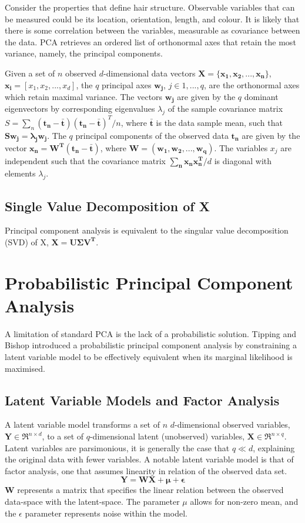 \documentclass[ %
                    author={Dillon Keith Diep [INCOMPLETE DRAFT, NOT FOR SUBMISSION]},
                supervisor={Dr. Carl Henrik Ek},
                    degree={MEng},
                     title={ART-CG:},
                  subtitle={Assisted Real-Time Content Generation of 3D Hair Geometry},
                      type={Research},
                      year={2014} ]{dissertation}
\begin{document}
Consider the properties that define hair structure. Observable variables that can be measured could be its location, orientation, length, and colour. It is likely that there is some correlation between the variables, measurable as covariance between the data. PCA retrieves an ordered list of orthonormal axes that retain the most variance, namely, the principal components.

{ \color{red}
Given a set of $n$ observed $d$-dimensional data vectors $\mathbf{X=\{x_1,x_2,...,x_n\}}$, $\mathbf{x_i} = [x_1,x_2,...,x_d]$, the $q$ principal axes $\mathbf{w_j}$, $j \in {1,...,q}$, are the orthonormal axes which retain maximal variance. The vectors $\mathbf{w_j}$ are given by the $q$ dominant eigenvectors by corresponding eigenvalues $\lambda_j$ of the sample covariance matrix $S=\sum_n\mathbf{(t_n-\bar{t})(t_n-\bar{t})}^T/n$, where $\mathbf{\bar{t}}$ is the data sample mean, such that $\mathbf{Sw_j=\lambda_jw_j}$. The $q$ principal components of the observed data $\mathbf{t_n}$ are given by the vector $\mathbf{x_n=W^T(t_n-\bar{t})}$, where $\mathbf{W=(w_1,w_2,...,w_q)}$. The variables $x_j$ are independent such that the covariance matrix $\mathbf{\sum_nx_nx^T_n}/d$ is diagonal with elements $\lambda_j$.
}

\subsection{Single Value Decomposition of X}
{ \color{red}
Principal component analysis is equivalent to the singular value decomposition (SVD) of X, $\mathbf{X=U\Sigma V^T}$.
}

\section{Probabilistic Principal Component Analysis}
A limitation of standard PCA is the lack of a probabilistic solution. Tipping and Bishop introduced a probabilistic principal component analysis by constraining a latent variable model to be effectively equivalent when its marginal likelihood is maximised. \cite{ppca}

\subsection{Latent Variable Models and Factor Analysis}
A latent variable model transforms a set of $n$ $d$-dimensional observed variables, $\mathbf{Y}\in\Re^{n \times d}$, to a set of $q$-dimensional latent (unobserved) variables, $\mathbf{X}\in\Re^{n \times q}$. Latent variables are parsimonious, it is generally the case that $q \ll d$, explaining the original data with fewer variables. A notable latent variable model is that of factor analysis, one that assumes linearity in relation of the observed data set.
\begin{equation} \label{ppca:fa}
	\mathbf{Y=WX+\mu+\epsilon}
\end{equation}
$\mathbf{W}$ represents a matrix that specifies the linear relation between the observed data-space with the latent-space.
The parameter $\mu$ allows for non-zero mean, and the $\epsilon$ parameter represents noise within the model.
\end{document}
